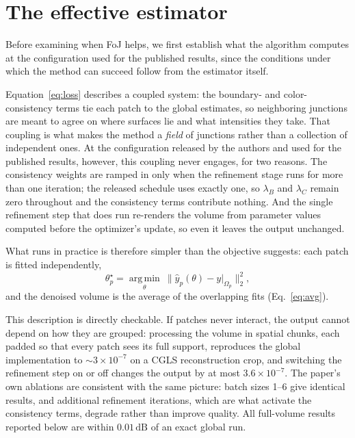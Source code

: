 \documentclass[11pt]{article}
\newcommand{\dB}{\,\mathrm{dB}}
\begin{document}
\section{The effective estimator}
\label{sec:mechanism}

Before examining when FoJ helps, we first establish what the algorithm
computes at the configuration used for the published results, since the
conditions under which the method can succeed follow from the estimator
itself.

Equation~\eqref{eq:loss} describes a coupled system: the boundary- and
color-consistency terms tie each patch to the global estimates, so
neighboring junctions are meant to agree on where surfaces lie and what
intensities they take. That coupling is what makes the method a
\emph{field} of junctions rather than a collection of independent ones.
At the configuration released by the authors and used for the published
results, however, this coupling never engages, for two reasons. The
consistency weights are ramped in only when the refinement stage runs
for more than one iteration; the released schedule uses exactly one, so
$\lambda_B$ and $\lambda_C$ remain zero throughout and the consistency
terms contribute nothing. And the single refinement step that does run
re-renders the volume from parameter values computed before the
optimizer's update, so even it leaves the output unchanged.

What runs in practice is therefore simpler than the objective suggests:
each patch is fitted independently,
\begin{equation}
  \theta_p^\star = \operatorname*{arg\,min}_{\theta}\
  \|\hat y_p(\theta) - y|_{\Omega_p}\|_2^2,
  \label{eq:perpatch}
\end{equation}
and the denoised volume is the average of the overlapping fits
(Eq.~\eqref{eq:avg}).

This description is directly checkable. If patches never interact, the
output cannot depend on how they are grouped: processing the volume in
spatial chunks, each padded so that every patch sees its full support,
reproduces the global implementation to $\sim\!3\times10^{-7}$ on a CGLS
reconstruction crop, and switching the refinement step on or off changes
the output by at most $3.6\times10^{-7}$. The paper's own ablations are
consistent with the same picture: batch sizes 1--6 give identical
results, and additional refinement iterations, which are what activate
the consistency terms, degrade rather than improve quality. All
full-volume results reported below are within $0.01\dB$ of an exact
global run.
\end{document}
